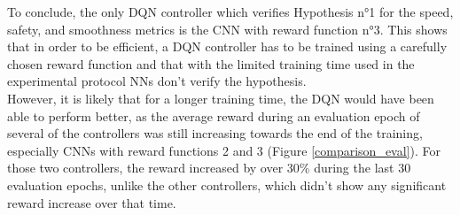 To conclude, the only DQN controller which verifies Hypothesis n°1 for the speed, safety, and smoothness metrics is the CNN with reward function n°3. This shows that in order to be efficient, a DQN controller has to be trained using a carefully chosen reward function and that with the limited training time used in the experimental protocol NNs don't verify the hypothesis. \\
However, it is likely that for a longer training time, the DQN would have been able to perform better, as the average reward during an evaluation epoch of several of the controllers was still increasing towards the end of the training, especially CNNs with reward functions 2 and 3 (Figure \ref{comparison_eval}). For those two controllers, the reward increased by over 30\% during the last 30 evaluation epochs, unlike the other controllers, which didn't show any significant reward increase over that time.


